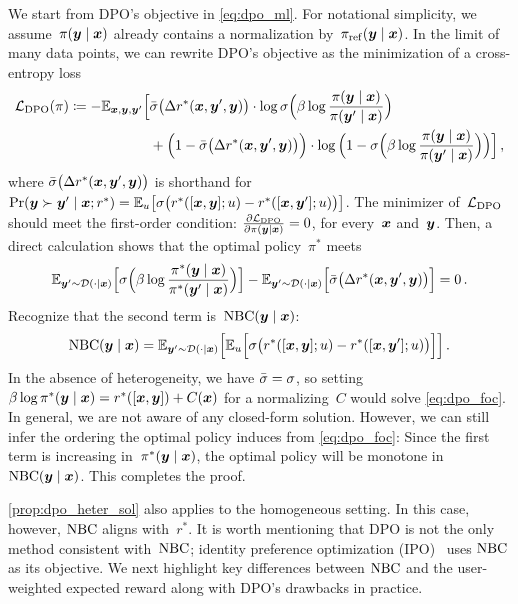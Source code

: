 \begin{proofEnd}
    We start from DPO's objective in \cref{eq:dpo_ml}. For notational simplicity, we assume~$\pi({\bm{y}} \mid {\bm{x}})$ already contains a normalization by~$\pi_{\rm ref}({\bm{y}} \mid {\bm{x}})$. In the limit of many data points, we can rewrite DPO's objective as the minimization of a cross-entropy loss
    \begin{align*}
        {\mathcal{L}}_{\rm DPO}(\pi) \coloneqq -\mathbb{E}_{{\bm{x}}, {\bm{y}}, {\bm{y}}'} \Big[ 
        &{\bar{\sigma}}\big(\Delta r^*({\bm{x}}, {\bm{y}}', {\bm{y}})\big) \cdot \log \sigma\Big(\beta \log \frac{\pi({\bm{y}} \mid {\bm{x}})}{\pi({\bm{y}}' \mid {\bm{x}})}\Big) \\
        &+ \Big(1 - {\bar{\sigma}}\big(\Delta r^*({\bm{x}}, {\bm{y}}', {\bm{y}})\big)\Big) \cdot \log \Big(1 - \sigma\Big(\beta \log \frac{\pi({\bm{y}} \mid {\bm{x}})}{\pi({\bm{y}}' \mid {\bm{x}})}\Big) \Big)
        \Big]
        \,,
    \end{align*}
    where ${\bar{\sigma}}\big(\Delta r^*({\bm{x}}, {\bm{y}}', {\bm{y}})\big)$ is shorthand for $\Pr({\bm{y}} \succ {\bm{y}}' \mid {\bm{x}}; r^*) = \mathbb{E}_u\big[\sigma\big(r^*([{\bm{x}}, {\bm{y}}]; u) - r^*([{\bm{x}}, {\bm{y}}']; u)\big)\big]$. The minimizer of~${\mathcal{L}}_{\rm DPO}$ should meet the first-order condition: $\pd{\gL_\dpo}{\pi(\vy \mid \vx)} = 0$, for every~${\bm{x}}$ and~${\bm{y}}$. Then, a direct calculation shows that the optimal policy~$\pi^*$ meets
    \begin{equation}
    \label{eq:dpo_foc}
        \mathbb{E}_{{\bm{y}}' \sim {\mathcal{D}}(\cdot \mid {\bm{x}})}\Big[\sigma\Big(\beta \log \frac{\pi^*({\bm{y}} \mid {\bm{x}})}{\pi^*({\bm{y}}' \mid {\bm{x}})}\Big)\Big] 
        - \mathbb{E}_{{\bm{y}}' \sim {\mathcal{D}}(\cdot \mid {\bm{x}})}\Big[{\bar{\sigma}}\big(\Delta r^*({\bm{x}}, {\bm{y}}', {\bm{y}})\big)\Big]
        = 0
        \,.
    \end{equation}
    Recognize that the second term is~${\rm NBC}({\bm{y}} \mid {\bm{x}})$:
    \begin{equation*}
        {\rm NBC}({\bm{y}} \mid {\bm{x}}) = \mathbb{E}_{{\bm{y}}' \sim {\mathcal{D}}(\cdot \mid {\bm{x}})} \Big[\mathbb{E}_u\Big[\sigma\big(r^*([{\bm{x}}, {\bm{y}}]; u) - r^*([{\bm{x}}, {\bm{y}}']; u)\big)\Big]\Big]
        \,.
    \end{equation*}
    In the absence of heterogeneity, we have ${\bar{\sigma}} = \sigma$, so setting $\beta \log \pi^*({\bm{y}} \mid {\bm{x}}) = r^*([{\bm{x}}, {\bm{y}}]) + C({\bm{x}})$ for a normalizing~$C$ would solve \cref{eq:dpo_foc}. In general, we are not aware of any closed-form solution. However, we can still infer the ordering the optimal policy induces from \cref{eq:dpo_foc}: Since the first term is increasing in~$\pi^*({\bm{y}} \mid {\bm{x}})$, the optimal policy will be monotone in~${\rm NBC}({\bm{y}} \mid {\bm{x}})$. This completes the proof.
\end{proofEnd}
\cref{prop:dpo_heter_sol} also applies to the homogeneous setting. In this case, however, ${\rm NBC}$ aligns with~$r^*$. 
It is worth mentioning that DPO is not the only method consistent with~${\rm NBC}$; identity preference optimization (IPO)~\citep{azar2024general} uses ${\rm NBC}$ as its objective. We next highlight key differences between ${\rm NBC}$ and the user-weighted expected reward along with DPO's drawbacks in practice.

